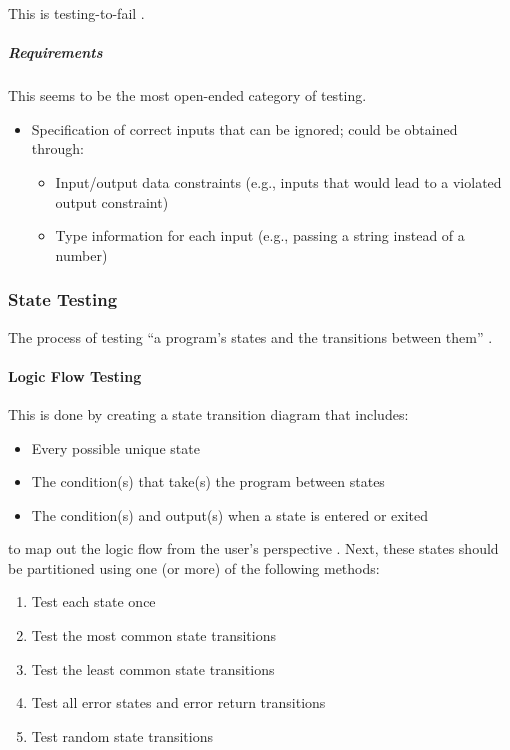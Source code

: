 This is testing-to-fail \cite[p.~77]{patton_software_2006}.

\subparagraph{Requirements}
This seems to be the most open-ended category of testing.
\begin{itemize}
      \item Specification of correct inputs that can be ignored;
            could be obtained through:
            \begin{itemize}
                  \item Input/output data constraints (e.g., inputs that would
                        lead to a violated output constraint)
                  \item Type information for each input (e.g., passing a string
                        instead of a number)
            \end{itemize}
\end{itemize}

\subsubsection{State Testing \cite[p.~79-87]{patton_software_2006}}

The process of testing ``a program's states and the transitions between them''
\cite[p.~79]{patton_software_2006}.

\paragraph{Logic Flow Testing \cite[p.~80-84]{patton_software_2006}}

This is done by creating a state transition diagram that includes:

\begin{itemize}
      \item Every possible unique state
      \item The condition(s) that take(s) the program between states
      \item The condition(s) and output(s) when a state is entered or exited
\end{itemize}

to map out the logic flow from the user's perspective
\cite[p.~81-82]{patton_software_2006}. Next, these states should be
partitioned using one (or more) of the following methods:

\begin{enumerate}
      \item Test each state once
      \item Test the most common state transitions
      \item Test the least common state transitions
      \item Test all error states and error return transitions
      \item Test random state transitions
            \cite[p.~82-83]{patton_software_2006}
\end{enumerate}

